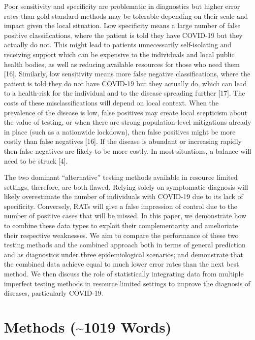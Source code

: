 \documentclass[]{elsarticle} %
\begin{document}
Poor sensitivity and specificity are problematic in diagnostics but higher error rates than gold-standard methods may be tolerable depending on their scale and impact given the local situation.
Low specificity means a large number of false positive classifications, where the patient is told they have COVID-19 but they actually do not.
This might lead to patients unnecessarily self-isolating and receiving support which can be expensive to the individuals and local public health bodies, as well as reducing available resources for those who need them {[}16{]}.
Similarly, low sensitivity means more false negative classifications, where the patient is told they do not have COVID-19 but they actually do, which can lead to a health-risk for the individual and to the disease spreading further {[}17{]}.
The costs of these misclassifications will depend on local context.
When the prevalence of the disease is low, false positives may create local scepticism about the value of testing, or when there are strong population-level mitigations already in place (such as a nationwide lockdown), then false positives might be more costly than false negatives {[}16{]}.
If the disease is abundant or increasing rapidly then false negatives are likely to be more costly.
In most situations, a balance will need to be struck {[}4{]}.

The two dominant ``alternative'' testing methods available in resource limited settings, therefore, are both flawed.
Relying solely on symptomatic diagnosis will likely overestimate the number of individuals with COVID-19 due to its lack of specificity.
Conversely, RATs will give a false impression of control due to the number of positive cases that will be missed.
In this paper, we demonstrate how to combine these data types to exploit their complementarity and amelioriate their respective weaknesses.
We aim to compare the performance of these two testing methods and the combined approach both in terms of general prediction and as diagnostics under three epidemiological scenarios; and demonstrate that the combined data achieve equal to much lower error rates than the next best method.
We then discuss the role of statistically integrating data from multiple imperfect testing methods in resource limited settings to improve the diagnosis of diseases, particularly COVID-19.

\hypertarget{methods-1019-words}{%
\section{Methods (\textasciitilde1019 Words)}\label{methods-1019-words}}
\end{document}
